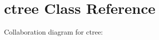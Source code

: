 \hypertarget{classctree}{}\section{ctree Class Reference}
\label{classctree}


Collaboration diagram for ctree\+:
